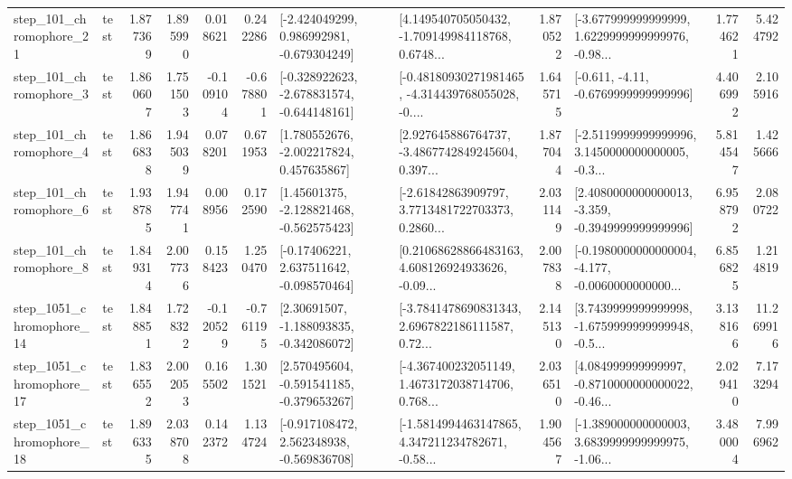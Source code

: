 \begin{tabular}{llrrrrllrlrr}
  step\_101\_chromophore\_21 &      test &      1.877369 &    1.895990 &      0.018621 &  0.242286 &   [-2.424049299, 0.986992981, -0.679304249] &  [4.149540705050432, -1.709149984118768, 0.6748... &       1.870522 &  [-3.677999999999999, 1.6229999999999976, -0.98... &            1.774621 &          5.424792 \\
   step\_101\_chromophore\_3 &      test &      1.860607 &    1.751503 &     -0.109104 & -0.678801 &  [-0.328922623, -2.678831574, -0.644148161] &  [-0.48180930271981465, -4.314439768055028, -0.... &       1.645715 &               [-0.611, -4.11, -0.6769999999999996] &            4.406992 &          2.105916 \\
   step\_101\_chromophore\_4 &      test &      1.866838 &    1.945039 &      0.078201 &  0.671953 &    [1.780552676, -2.002217824, 0.457635867] &  [2.927645886764737, -3.4867742849245604, 0.397... &       1.877044 &  [-2.5119999999999996, 3.1450000000000005, -0.3... &            5.814547 &          1.425666 \\
   step\_101\_chromophore\_6 &      test &      1.938785 &    1.947741 &      0.008956 &  0.172590 &    [1.45601375, -2.128821468, -0.562575423] &  [-2.61842863909797, 3.7713481722703373, 0.2860... &       2.031149 &  [2.4080000000000013, -3.359, -0.3949999999999996] &            6.958792 &          2.080722 \\
   step\_101\_chromophore\_8 &      test &      1.849314 &    2.007736 &      0.158423 &  1.250470 &    [-0.17406221, 2.637511642, -0.098570464] &  [0.21068628866483163, 4.608126924933626, -0.09... &       2.007838 &  [-0.1980000000000004, -4.177, -0.0060000000000... &            6.856825 &          1.214819 \\
 step\_1051\_chromophore\_14 &      test &      1.848851 &    1.728322 &     -0.120529 & -0.761195 &    [2.30691507, -1.188093835, -0.342086072] &  [-3.7841478690831343, 2.6967822186111587, 0.72... &       2.145130 &  [3.7439999999999998, -1.6759999999999948, -0.5... &            3.138166 &         11.269916 \\
 step\_1051\_chromophore\_17 &      test &      1.836552 &    2.002053 &      0.165502 &  1.301521 &   [2.570495604, -0.591541185, -0.379653267] &  [-4.367400232051149, 1.4673172038714706, 0.768... &       2.036510 &  [4.084999999999997, -0.8710000000000022, -0.46... &            2.029410 &          7.173294 \\
 step\_1051\_chromophore\_18 &      test &      1.896335 &    2.038708 &      0.142372 &  1.134724 &   [-0.917108472, 2.562348938, -0.569836708] &  [-1.5814994463147865, 4.347211234782671, -0.58... &       1.904567 &  [-1.389000000000003, 3.6839999999999975, -1.06... &            3.480004 &          7.996962 \\

\end{tabular}
